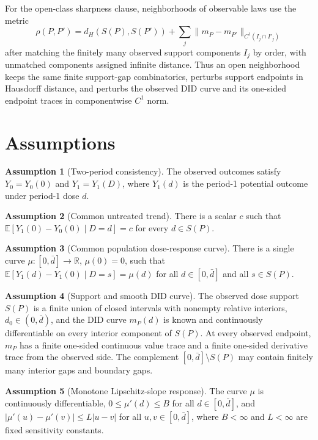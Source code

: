 \documentclass[11pt]{article}
\newcommand{\E}{\mathbb{E}}
\newcommand{\R}{\mathbb{R}}
\theoremstyle{definition}
\newtheorem{assumption}{Assumption}
\theoremstyle{plain}
\theoremstyle{remark}
\begin{document}
For the open-class sharpness clause, neighborhoods of observable laws use the metric
\[
  \rho(P,P')=d_H(S(P),S(P'))+\sum_j \|m_P-m_{P'}\|_{C^1(I_j\cap I'_j)}
\]
after matching the finitely many observed support components \(I_j\) by order, with unmatched components assigned infinite distance.  Thus an open neighborhood keeps the same finite support-gap combinatorics, perturbs support endpoints in Hausdorff distance, and perturbs the observed DID curve and its one-sided endpoint traces in componentwise \(C^1\) norm.

\section{Assumptions}
\begin{assumption}[Two-period consistency]\label{ass:consistency}
The observed outcomes satisfy \(Y_0=Y_0(0)\) and \(Y_1=Y_1(D)\), where \(Y_1(d)\) is the period-1 potential outcome under period-1 dose \(d\).
\end{assumption}

\begin{assumption}[Common untreated trend]\label{ass:common-trend}
There is a scalar \(c\) such that \(\E[Y_1(0)-Y_0(0)\mid D=d]=c\) for every \(d\in S(P)\).
\end{assumption}

\begin{assumption}[Common population dose-response curve]\label{ass:common-mu}
There is a single curve \(\mu:[0,\bar d]\to\R\), \(\mu(0)=0\), such that \(\E[Y_1(d)-Y_1(0)\mid D=s]=\mu(d)\) for all \(d\in[0,\bar d]\) and all \(s\in S(P)\).
\end{assumption}

\begin{assumption}[Support and smooth DID curve]\label{ass:support}
The observed dose support \(S(P)\) is a finite union of closed intervals with nonempty relative interiors, \(d_0\in(0,\bar d)\), and the DID curve \(m_P(d)\) is known and continuously differentiable on every interior component of \(S(P)\).  At every observed endpoint, \(m_P\) has a finite one-sided continuous value trace and a finite one-sided derivative trace from the observed side.  The complement \([0,\bar d]\setminus S(P)\) may contain finitely many interior gaps and boundary gaps.
\end{assumption}

\begin{assumption}[Monotone Lipschitz-slope response]\label{ass:shape}
The curve \(\mu\) is continuously differentiable, \(0\le \mu'(d)\le B\) for all \(d\in[0,\bar d]\), and \(|\mu'(u)-\mu'(v)|\le L|u-v|\) for all \(u,v\in[0,\bar d]\), where \(B<\infty\) and \(L<\infty\) are fixed sensitivity constants.
\end{assumption}
\end{document}
